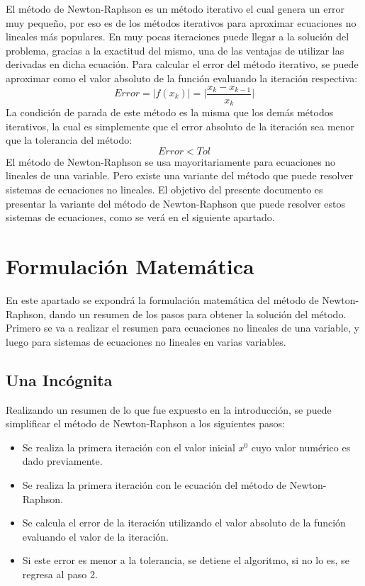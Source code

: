 \documentclass[journal]{IEEEtran}
\begin{document}
\indent El método de Newton-Raphson es un método iterativo el cual genera un error muy pequeño, por eso es de los métodos iterativos para aproximar ecuaciones no lineales más populares. En muy pocas iteraciones puede llegar a la solución del problema, gracias a la exactitud del mismo, una de las ventajas de utilizar las derivadas en dicha ecuación. Para calcular el error del método iterativo, se puede aproximar como el valor absoluto de la función evaluando la iteración respectiva:
\begin{equation}
Error = \lvert f(x_{k}) \rvert = \lvert  \frac{x_{k} - x_{k - 1}}{x_{k}} \rvert
\label{eq:errorAbs}
\end{equation}
\indent La condición de parada de este método es la misma que los demás métodos iterativos, la cual es simplemente que el error absoluto de la iteración sea menor que la tolerancia del método:
\begin{equation}
Error < Tol
\label{eq:condParada}
\end{equation}
\indent El método de Newton-Raphson se usa mayoritariamente para ecuaciones no lineales de una variable. Pero existe una variante del método que puede resolver sistemas de ecuaciones no lineales. El objetivo del presente documento es presentar la variante del método de Newton-Raphson que puede resolver estos sistemas de ecuaciones, como se verá en el siguiente apartado.

\section{Formulación Matemática}
En este apartado se expondrá la formulación matemática del método de Newton-Raphson, dando un resumen de los pasos para obtener la solución del método. Primero se va a realizar el resumen para ecuaciones no lineales de una variable, y luego para sistemas de ecuaciones no lineales en varias variables.

\subsection{Una Incógnita}
Realizando un resumen de lo que fue expuesto en la introducción, se puede simplificar el método de Newton-Raphson a los siguientes pasos:
\begin{itemize}
    \item Se realiza la primera iteración con el valor inicial \(x^0\) cuyo valor numérico es dado previamente. 
    \item Se realiza la primera iteración con le ecuación del método de Newton-Raphson.
    \item Se calcula el error de la iteración utilizando el valor absoluto de la función evaluando el valor de la iteración.
    \item Si este error es menor a la tolerancia, se detiene el algoritmo, si no lo es, se regresa al paso 2.
\end{itemize}
\end{document}
